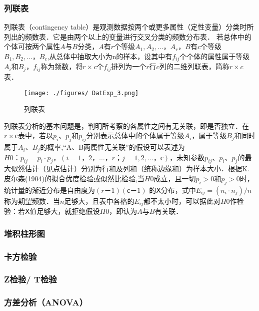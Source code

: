 \subsubsection{列联表}
列联表（contingency table）是观测数据按两个或更多属性（定性变量）分类时所列出的频数表．它是由两个以上的变量进行交叉分类的频数分布表．
若总体中的个体可按两个属性$A$与$B$分类，$A$有$r$个等级$A_1,A_2,…，A_r$，$B$有$c$个等级$B_1,B_2,…，B_c$,从总体中抽取大小为n的样本，设其中有$f_{ij}$个个体的属性属于等级$A_i$和$B_j$，$f_{ij}$称为频数，将$r×c$个$f_{ij}$排列为一个$r$行$c$列的二维列联表，简称$r×c$表．
\begin{figure}[ht]
\centering
\texttt{[image: ./figures/
DatExp\_3.png]}
\caption{列联表} \label{DatExp_fig3}
\end{figure}
列联表分析的基本问题是，判明所考察的各属性之间有无关联，即是否独立．在$r×с$表中，若以$p_i$、$p_j$和$p_{ij}$分别表示总体中的个体属于等级$A_i$，属于等级$B_j$和同时属于$A_i$、$B_j$的概率,“A、B两属性无关联”的假设可以表述为$H0：p_{ij}=p_i·p_j，(i=1，2，…，r；j=1,2,…，с)$，未知参数$p_{ij}$、$p_i$、$p_j$的最大似然估计（见点估计）分别为行和及列和（统称边缘和）为样本大小．根据K.皮尔森(1904)的拟合优度检验或似然比检验,当$H0$成立，且一切$p_i>0$和$p_j>0$时，统计量的渐近分布是自由度为$(r－1)(с－1)$ 的$Ⅹ$分布，式中$E_{ij}=(n_i·n_j)/n$称为期望频数．当$n$足够大，且表中各格的$E_{ij}$都不太小时，可以据此对$H0$作检验：若$Ⅹ$值足够大，就拒绝假设$H0$，即认为$A$与$B$有关联．
\subsubsection{堆积柱形图}
\subsubsection{卡方检验}
\subsubsection{Z检验/ T检验}
\subsubsection{方差分析（ANOVA）}
